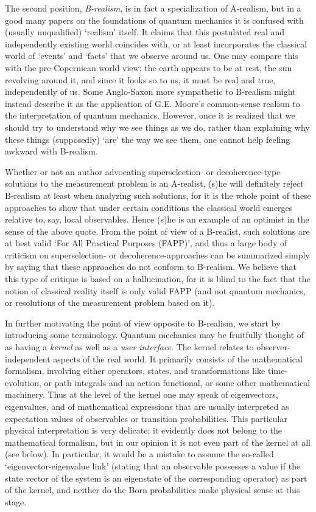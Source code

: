 \documentclass[12pt,titlepage]{article}
\begin{document}
The second position, {\em B-realism}, is in fact a specialization of A-realism,
but in a good many
papers on the foundations of quantum mechanics it is confused with (usually
unqualified) `realism'
itself. It claims that
this postulated real and independently existing world coincides with, or at
least incorporates the
classical world of `events' and `facts' that we observe around us. One may
compare this with the
pre-Copernican world view: the earth appears to be at rest, the sun revolving
around it, and since it
looks so to us, it must be real and true, independently of us. Some Anglo-Saxon
more sympathetic to
B-realism might instead describe it as the application of G.E. Moore's
common-sense realism to the
interpretation of quantum mechanics. However, once it is realized that we
should try to understand why
we see things as we do, rather than  explaining why these things  (supposedly)
`are' the way we see
them, one cannot help feeling awkward with B-realism.

Whether or not an author advocating superselection- or decoherence-type
solutions to the measurement
problem is an A-realist, (s)he will definitely reject B-realism at least when
analyzing such
solutions, for it is the whole point of these approaches to show that under
certain conditions the
classical world emerges relative to, say, local observables. Hence (s)he is an
example of an optimist
in the sense of the above quote. From the point of view of a B-realist, such
solutions are at best
valid `For All Practical Purposes (FAPP)', and thus a large body of  criticism
on superselection- or
decoherence-approaches can be summarized simply by saying that  these
approaches do not  conform to
B-realism. We believe that this type of critique is based on a hallucination,
for
it is blind to the fact that the
notion of classical reality itself is only valid FAPP (and not quantum
mechanics, or resolutions of the measurement problem based on it).

In further motivating the  point of view opposite to B-realism, we
start by introducing some terminology.
Quantum mechanics may be fruitfully thought of as having a {\em kernel} as well
as a {\em user
interface}. The kernel relates to observer-independent aspects of the real
world. It primarily
consists of the mathematical formalism, involving either operators, states,
and transformations like time-evolution, or path integrals and an action
functional, or some other
mathematical machinery. Thus at the level of the kernel one may speak of
eigenvectors, eigenvalues,
and of mathematical expressions that are usually interpreted as   expectation
values of observables
or  transition probabilities.   This particular physical interpretation is very
delicate;
it evidently does not belong to the mathematical formalism, but
  in our opinion it is not even  part of the kernel at all (see below).
 In particular, it would be a mistake to assume the
so-called `eigenvector-eigenvalue link' (stating that an observable possesses a
value   if the
state vector of the system is an eigenstate of the corresponding operator) as
part of the kernel, and
neither do the Born probabilities make physical sense at this stage.
\end{document}
